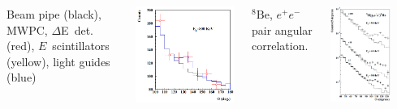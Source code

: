 \documentclass{beamer}
\begin{document}
\begin{frame}
\begin{itemize}
\begin{columns}
					\tiny{Beam pipe (black), MWPC, $\Delta$E~det. (red), $E$~scintillators (yellow), light guides (blue)}
					\centering
					\begin{minipage}[t][4cm]{\textwidth}
						\centering
						\includegraphics[width=\textwidth]{../images/atomki_be.png}
					\end{minipage}
					\footnotesize{$ {}^8\text{Be} $, $e^{+}e^{-}$ pair angular correlation.~\cite{atomki_be}}
					\centering
					\begin{minipage}[t][4cm]{\textwidth}
						\centering
						\includegraphics[width=0.7\textwidth]{../images/atomki_he.png}\newline

\end{minipage}
\end{columns}
\end{itemize}
\end{frame}
\end{document}
